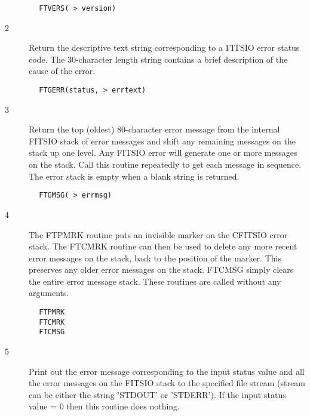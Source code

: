 \documentclass[11pt]{book}
\begin{document}
\begin{verbatim}
        FTVERS( > version)
\end{verbatim}

\begin{description}
\item[2 ] Return the descriptive text string corresponding to a FITSIO error
    status code.   The 30-character length string contains a brief
   description of the cause of the error.
\end{description}

\begin{verbatim}
        FTGERR(status, > errtext)
\end{verbatim}

\begin{description}
\item[3 ] Return the top (oldest) 80-character error message from the
    internal FITSIO stack of error messages and shift any remaining
    messages on the stack up one level.  Any FITSIO error will
    generate one or more messages on the stack.  Call this routine
    repeatedly to get each message in sequence.  The error stack is empty
   when a blank string is returned.
\end{description}

\begin{verbatim}
        FTGMSG( > errmsg)
\end{verbatim}

\begin{description}
\item[4 ]The FTPMRK routine puts an invisible marker on the
   CFITSIO error stack.  The FTCMRK routine can then be
   used to delete any more recent error messages on the stack, back to
   the position of the marker.  This preserves any older error messages
   on the stack.  FTCMSG simply clears the entire error message stack.
  These routines are called without any arguments.
\end{description}

\begin{verbatim}
        FTPMRK
        FTCMRK
        FTCMSG
\end{verbatim}


\begin{description}
\item[5 ] Print out the error message corresponding to the input status
    value and all the error messages on the FITSIO stack  to the specified
    file stream  (stream can be either the string 'STDOUT' or 'STDERR').
   If the input status value = 0 then this routine does nothing.
\end{description}
\end{document}
